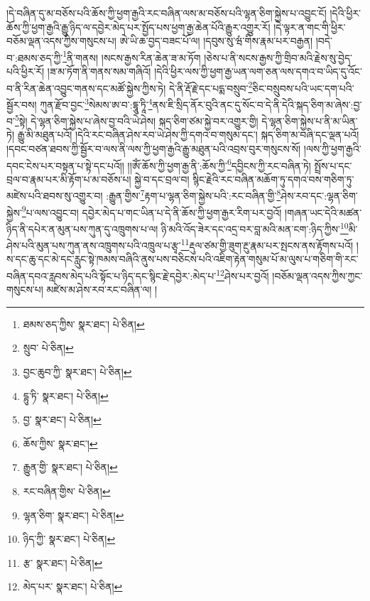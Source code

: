 །དེ་བཞིན་དུ་མ་བཅོས་པའི་ཆོས་ཀྱི་ཕྱག་རྒྱའི་རང་བཞིན་ལས་མ་བཅོས་པའི་ལྷན་ཅིག་སྐྱེས་པ་འབྱུང་ངོ། །དེའི་ཕྱིར་ཆོས་ཀྱི་ཕྱག་རྒྱའི་རྒྱུ་ཉིད་ལ་དབྱེར་མེད་པར་སྤྱོད་པས་ཕྱག་རྒྱ་ཆེན་པོའི་རྒྱུར་འགྱུར་རོ། །དེ་ལྟར་ན་གང་གི་ཕྱིར་བཅོམ་ལྡན་འདས་ཀྱིས་གསུངས་པ། ཨེ་ཡི་ཆ་བྱད་བཟང་པོ་ལ། །དབུས་སུ་ཝཾ་གིས་རྣམ་པར་བརྒྱན། །བདེ་བ་:ཐམས་ཅད་ཀྱི་\footnote{ཐམས་ཅད་ཀྱིས་  སྣར་ཐང་།  པེ་ཅིན། }ནི་གནས། །སངས་རྒྱས་རིན་ཆེན་ཟ་མ་ཏོག །ཅེས་པ་ནི་སངས་རྒྱས་ཀྱི་གྲིབ་མའི་རྗེས་སུ་བྱེད་པའི་ཕྱིར་རོ། །ཟ་མ་ཏོག་ནི་གནས་སམ་གཞིའོ། །དེའི་ཕྱིར་ལས་ཀྱི་ཕྱག་རྒྱ་ཡན་ལག་ཅན་ལས་དགའ་བ་ཡིད་དུ་འོང་བ་ནི་རིན་ཆེན་འབྱུང་གནས་དང་མཚོ་སྐྱེས་ཀྱིས་ཏེ། དེ་ནི་རྡོ་རྗེ་དང་པདྨ་བསྲུབ་\footnote{སྲུབ་  པེ་ཅིན། }ཅིང་བསྲུབས་པའི་ཡང་དག་པའི་སྦྱོར་བས། ཀུན་རྫོབ་བྱང་\footnote{བྱང་ཆུབ་ཀྱི་  སྣར་ཐང་།  པེ་ཅིན། }སེམས་ཨ་བ་:དྷཱུ་ཏཱི་\footnote{དྷུ་ཏི་  སྣར་ཐང་།  པེ་ཅིན། }ནས་ཇི་སྲིད་ནོར་བུའི་ནང་དུ་སོང་བ་དེ་ནི་དེའི་སྐད་ཅིག་མ་ཞེས་:བྱ་བ་\footnote{བྱ་  སྣར་ཐང་།  པེ་ཅིན། }སྟེ། དེ་ལྷན་ཅིག་སྐྱེས་པ་ཞེས་བྱ་བའི་ཡེ་ཤེས། སྐད་ཅིག་ཙམ་སྐྱེ་བར་འགྱུར་གྱི། དེ་ལྷན་ཅིག་སྐྱེས་པ་ནི་མ་ཡིན་ཏེ། རྒྱུ་མི་མཐུན་པའོ། །དེའི་རང་བཞིན་ཤེས་རབ་ཡེ་ཤེས་ཀྱི་དགའ་བ་གསུམ་དང་། སྐད་ཅིག་མ་བཞི་དང་ལྡན་པའོ། །དབང་བཙན་ཐབས་ཀྱི་སྦྱོར་བ་ལས་ནི་ལས་ཀྱི་ཕྱག་རྒྱའི་རྒྱུ་མཐུན་པའི་འབྲས་བུར་གསུངས་སོ། །ལས་ཀྱི་ཕྱག་རྒྱའི་དབང་ངེས་པར་བསྟན་པ་སྟེ་དང་པའོ།། །།ཨོཾ་ཆོས་ཀྱི་ཕྱག་རྒྱ་ནི་:ཆོས་ཀྱི་\footnote{ཆོས་ཀྱིས་  སྣར་ཐང་། }དབྱིངས་ཀྱི་རང་བཞིན་ཏེ། སྤྲོས་པ་དང་བྲལ་བ་རྣམ་པར་མི་རྟོག་པ་མ་བཅོས་པ། སྐྱེ་བ་དང་བྲལ་བ། སྙིང་རྗེའི་རང་བཞིན་མཆོག་ཏུ་དགའ་བས་གཅིག་ཏུ་མཛེས་པའི་ཐབས་སུ་འགྱུར་བ། :རྒྱུན་གྱིས་\footnote{རྒྱུན་གྱི་  སྣར་ཐང་།  པེ་ཅིན། }རྟག་པ་ལྷན་ཅིག་སྐྱེས་པའི་:རང་བཞིན་གྱི་\footnote{རང་བཞིན་གྱིས་  པེ་ཅིན། }ཤེས་རབ་དང་:ལྷན་ཅིག་སྐྱེས་\footnote{ལྷན་ཅིག་  སྣར་ཐང་།  པེ་ཅིན། }པ་ལས་འབྱུང་བ། དབྱེར་མེད་པ་གང་ཡིན་པ་དེ་ནི་ཆོས་ཀྱི་ཕྱག་རྒྱར་རིག་པར་བྱའོ། །གཞན་ཡང་དེའི་མཚན་ཉིད་ནི་དཔེར་ན་མུན་པས་ཀུན་དུ་འཁྲུགས་པ་ལ། ཉི་མའི་འོད་ཟེར་དང་འདྲ་བར་བླ་མའི་མན་ངག་:ཉིད་ཀྱིས་\footnote{ཉིད་ཀྱི་  སྣར་ཐང་།  པེ་ཅིན། }མི་ཤེས་པའི་མུན་པས་ཀུན་ནས་འཁྲུགས་པའི་འཁྲུལ་པ་རྩྭ་\footnote{རྩ་  སྣར་ཐང་།  པེ་ཅིན། }རྡུལ་ཙམ་གྱི་ཟུག་རྔུ་རྣམ་པར་སྤངས་ནས་རྟོགས་པའོ། །ས་དང་ཆུ་དང་མེ་དང་རླུང་སྟེ་ཁམས་བཞིའི་ནུས་པས་བཅིངས་པའི་འཇིག་རྟེན་གསུམ་པོ་མ་ལུས་པ་གཅིག་གི་རང་བཞིན་དབའ་རླབས་མེད་པའི་སྟོང་པ་ཉིད་དང་སྙིང་རྗེ་དབྱེར་:མེད་པ་\footnote{མེད་པར་  སྣར་ཐང་།  པེ་ཅིན། }ཤེས་པར་བྱའོ། །བཅོམ་ལྡན་འདས་ཀྱིས་ཀྱང་གསུངས་པ། མཛེས་མ་ཤེས་རབ་རང་བཞིན་ལ། །
